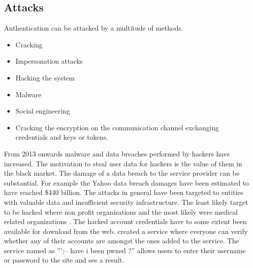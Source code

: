 \subsection{Attacks}
\begin{sloppypar}
    Authentication can be attacked by a multitude of methods.     
    \begin{itemize}
        \item Cracking
        \item Impersonation attacks
        \item Hacking the system
        \item Malware
        \item Social engineering
        \item Cracking the encryption on the communication channel exchanging 
        credentials and keys or tokens.
    \end{itemize}
\end{sloppypar}
\begin{sloppypar}
    From 2013 onwards malware and data breaches performed by hackers have 
    increased. The motivation to steal user data for hackers is the value of 
    them in the black market. The damage of a data breach to the service 
    provider can be substantial. For example the Yahoo data breach damages have 
    been estimated to have reached \$440 billion. The attacks in general have 
    been targeted to entities with valuable data and insufficient security 
    infrastructure. The least likely target to be hacked where non profit 
    organisations and the most likely were medical related organizations 
    \citep{breach}. The hacked account credentials have to some extent been 
    available for download from the web. \citet{pwned} created a service where 
    everyone can verify whether any of their accounts are amongst the ones added 
    to the service. The service named as ”’;– have i been pwned ?” allows users 
    to enter their username or password to the site and see a result.
\end{sloppypar}




